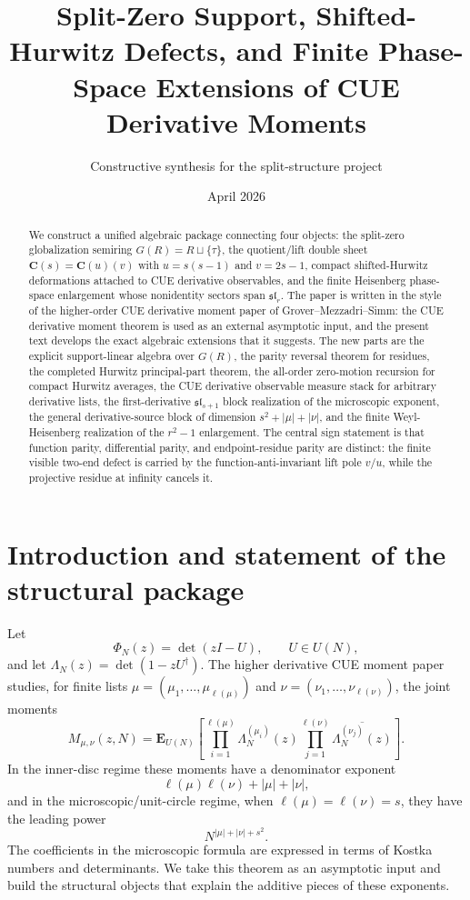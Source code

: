 \documentclass[11pt]{article}
\title{Split-Zero Support, Shifted-Hurwitz Defects, and Finite Phase-Space Extensions of CUE Derivative Moments}
\author{Constructive synthesis for the split-structure project}
\date{April 2026}
\newcommand{\C}{\mathbf C}
\theoremstyle{plain}
\theoremstyle{definition}
\begin{document}
\maketitle

\begin{abstract}
We construct a unified algebraic package connecting four objects: the split-zero globalization semiring
\(G(R)=R\sqcup\{\tau\}\), the quotient/lift double sheet \(\C(s)=\C(u)(v)\) with
\(u=s(s-1)\) and \(v=2s-1\), compact shifted-Hurwitz deformations attached to CUE derivative observables, and the finite Heisenberg phase-space enlargement whose nonidentity sectors span \(\mathfrak{sl}_r\).  The paper is written in the style of the higher-order CUE derivative moment paper of Grover--Mezzadri--Simm: the CUE derivative moment theorem is used as an external asymptotic input, and the present text develops the exact algebraic extensions that it suggests.  The new parts are the explicit support-linear algebra over \(G(R)\), the parity reversal theorem for residues, the completed Hurwitz principal-part theorem, the all-order zero-motion recursion for compact Hurwitz averages, the CUE derivative observable measure stack for arbitrary derivative lists, the first-derivative \(\mathfrak{sl}_{s+1}\) block realization of the microscopic exponent, the general derivative-source block of dimension \(s^2+|\mu|+|\nu|\), and the finite Weyl-Heisenberg realization of the \(r^2-1\) enlargement.  The central sign statement is that function parity, differential parity, and endpoint-residue parity are distinct: the finite visible two-end defect is carried by the function-anti-invariant lift pole \(v/u\), while the projective residue at infinity cancels it.
\end{abstract}

\tableofcontents

\section{Introduction and statement of the structural package}

Let
\[
   \Phi_N(z)=\det(zI-U),\qquad U\in U(N),
\]
and let \(\Lambda_N(z)=\det(1-zU^\dagger)\).  The higher derivative CUE moment paper studies, for finite lists
\(\mu=(\mu_1,\ldots,\mu_{\ell(\mu)})\) and \(\nu=(\nu_1,\ldots,\nu_{\ell(\nu)})\), the joint moments
\[
 M_{\mu,\nu}(z,N)=\mathbf E_{U(N)}\left[
     \prod_{i=1}^{\ell(\mu)}\Lambda_N^{(\mu_i)}(z)
     \prod_{j=1}^{\ell(\nu)}\overline{\Lambda_N^{(\nu_j)}(z)}
 \right].
\]
In the inner-disc regime these moments have a denominator exponent
\[
   \ell(\mu)\ell(\nu)+|\mu|+|\nu|,
\]
and in the microscopic/unit-circle regime, when \(\ell(\mu)=\ell(\nu)=s\), they have the leading power
\[
   N^{|\mu|+|\nu|+s^2}.
\]
The coefficients in the microscopic formula are expressed in terms of Kostka numbers and determinants.  We take this theorem as an asymptotic input and build the structural objects that explain the additive pieces of these exponents.
\end{document}
